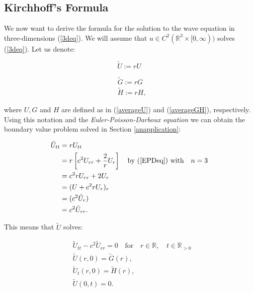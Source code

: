 \documentclass[a4paper, 12pt]{article}
\numberwithin{equation}{section}
\begin{document}
\subsection{Kirchhoff's Formula}
We now want to derive the formula for the solution to the wave equation in
three-dimensions (\ref{3deq}). We will assume that $u \in C^2(\mathbb{R}^3
\times [0, \infty))$ solves (\ref{3deq}). Let us denote:

\begin{equation} \label{Udash}
    \tilde{U}:=rU
\end{equation}

\begin{equation} \label{GHdash}
    \begin{aligned}
        &\tilde{G}:=rG\\
        &\tilde{H}:=rH,    
    \end{aligned}
\end{equation}

where $U,G$ and $H$ are defined as in (\ref{averageU}) and (\ref{averageGH}),
respectively. \\

Using this notation and the \emph{Euler-Poisson-Darboux equation} we can obtain
the boundary value problem solved in Section \ref{anapplication}:

\begin{equation*}
    \begin{aligned}
        \tilde{U}_{tt}&=rU_{tt}\\
        &=r\left[c^2U_{rr}+\frac{2}{r}U_r\right] \quad \textrm{by (\ref{EPDeq}) with} \quad n=3\\
        &=c^2rU_{rr}+2U_r\\
        &=(U+c^2rU_r)_r\\
        &=(c^2\tilde{U}_r)\\
        &=c^2\tilde{U}_{rr}.        
    \end{aligned}
\end{equation*}

This means that $\tilde{U}$ solves:

\begin{equation} \label{tilUwave}
    \begin{aligned}
        &\tilde{U}_{tt}-c^2\tilde{U}_{rr}=0 \quad \textrm {for} \quad r \in \mathbb{R}, \quad t \in \mathbb{R}_{>0}\\
        &\tilde{U}(r, 0)=\tilde{G}(r), \\
        &\tilde{U}_t(r, 0)=\tilde{H}(r),\\
        &\tilde{U}(0, t)=0.
    \end{aligned}
\end{equation}
\end{document}
